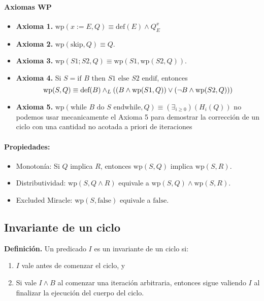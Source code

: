 \documentclass[9pt]{extarticle}  %
\newcommand{\smalltable}{\fontsize{8pt}{10pt}\selectfont}
\begin{document}
\paragraph*{Axiomas WP}
\begin{itemize}
    \item \textbf{Axioma 1.} \( \text{wp}(x := E, Q) \equiv \text{def}(E) \land Q_{E}^x \)
    \item \textbf{Axioma 2.} \( \text{wp}(\text{skip}, Q) \equiv Q \).
    \item \textbf{Axioma 3.} \( \text{wp}(S1; S2, Q) \equiv \text{wp}(S1,\text{wp}(S2, Q)) \).
    \item \textbf{Axioma 4.} Si \(S = \text{if } B \text{ then } S1 \text{ else } S2 \text{ endif}\), entonces
    \[
    \text{wp}(S, Q) \equiv \text{def}(B) \land _L \left( (B \land \text{wp}(S1, Q)) \vee (\neg B \land \text{wp}(S2, Q)) \right)
    \]
     \item \textbf{Axioma 5.} \( \text{wp}(\text{while } B \text{ do } S \text{ endwhile}, Q) \equiv (\exists_{i \geq 0})({ H_i}(Q)) \)  no podemos usar mecanicamente el Axioma 5
para demostrar la corrección de un ciclo con una cantidad no
acotada a priori de iteraciones
\end{itemize}


\vspace{-0.5cm}
\paragraph*{Propiedades:}
\begin{itemize}
    \item Monotonía: Si \( Q \) implica \( R \), entonces \( \text{wp}(S, Q) \) implica \( \text{wp}(S, R) \).
    \item Distributividad: \( \text{wp}(S, Q \land R) \) equivale a \( \text{wp}(S, Q) \land \text{wp}(S, R) \).
    \item Excluded Miracle: \( \text{wp}(S, \text{false}) \) equivale a \( \text{false} \).
    \vspace{-0.5cm}
    \vspace{-0.5cm}
\vspace{-0.5cm}
\end{itemize}
\vspace{-0.5cm}

\vspace{-0.5cm}
\subsection*{\tiny{Invariante de un ciclo}}
\noindent\smalltable
\textbf{Definición.} Un predicado \( I \) es un invariante de un ciclo si:
\begin{enumerate}
    \item \( I \) vale antes de comenzar el ciclo, y
    \item Si vale \( I \land B \) al comenzar una iteración arbitraria, entonces sigue valiendo \( I \) al finalizar la ejecución del cuerpo del ciclo.
\end{enumerate}
\end{document}
